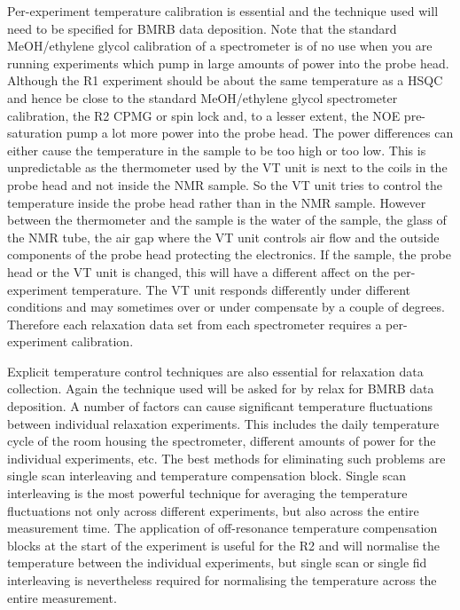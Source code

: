 Per-experiment temperature calibration is essential and the technique used will need to be specified for BMRB data deposition.
Note that the standard MeOH/ethylene glycol calibration of a spectrometer is of no use when you are running experiments which pump in large amounts of power into the probe head.
Although the R1 experiment should be about the same temperature as a HSQC and hence be close to the standard MeOH/ethylene glycol spectrometer calibration, the R2 CPMG or spin lock and, to a lesser extent, the NOE pre-saturation pump a lot more power into the probe head.
The power differences can either cause the temperature in the sample to be too high or too low.
This is unpredictable as the thermometer used by the VT unit is next to the coils in the probe head and not inside the NMR sample.
So the VT unit tries to control the temperature inside the probe head rather than in the NMR sample.
However between the thermometer and the sample is the water of the sample, the glass of the NMR tube, the air gap where the VT unit controls air flow and the outside components of the probe head protecting the electronics.
If the sample, the probe head or the VT unit is changed, this will have a different affect on the per-experiment temperature.
The VT unit responds differently under different conditions and may sometimes over or under compensate by a couple of degrees.
Therefore each relaxation data set from each spectrometer requires a per-experiment calibration.

Explicit temperature control techniques are also essential for relaxation data collection.
Again the technique used will be asked for by relax for BMRB data deposition.
A number of factors can cause significant temperature fluctuations between individual relaxation experiments.
This includes the daily temperature cycle of the room housing the spectrometer, different amounts of power for the individual experiments, etc.
The best methods for eliminating such problems are single scan interleaving and temperature compensation block.
Single scan interleaving is the most powerful technique for averaging the temperature fluctuations not only across different experiments, but also across the entire measurement time.
The application of off-resonance temperature compensation blocks at the start of the experiment is useful for the R2 and will normalise the temperature between the individual experiments, but single scan or single fid interleaving is nevertheless required for normalising the temperature across the entire measurement.



